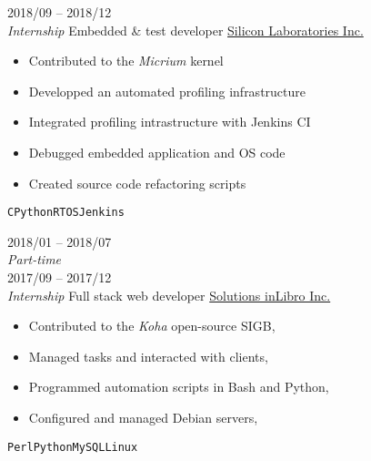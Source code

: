 \documentclass[9pt]{developercv} %
\begin{document}
\begin{minipage}[t]{0.8\textwidth}

\begin{entrylist}
	\entry
		{2018/09 -- 2018/12\\{\small\emph{Internship}}}
		{Embedded \& test developer}
		{\href{https://www.silabs.com/}{Silicon Laboratories Inc.}}
		{
			\vspace{-14pt}
			\begin{itemize}
				\renewcommand{\labelitemi}{\raisebox{.45ex}{\rule{.6ex}{.6ex}}} 
				\setlength\itemsep{-1pt}
				\item Contributed to the \emph{Micrium} kernel
				\item Developped an automated profiling infrastructure
				\item Integrated profiling intrastructure with Jenkins CI
				\item Debugged embedded application and OS code
				\item Created source code refactoring scripts
			\end{itemize}
			\vspace{-4pt}
			\texttt{C}\slashsep\texttt{Python}\slashsep\texttt{RTOS}\slashsep\texttt{Jenkins}
		}
	\entry
		{2018/01 -- 2018/07\\{\small\emph{Part-time}}\\2017/09 -- 2017/12\\{\small\emph{Internship}}}
		{Full stack web developer}
		{\href{https://inlibro.com/en/}{Solutions inLibro Inc.}}
		{
			\vspace{-14pt}
			\begin{itemize}
				\renewcommand{\labelitemi}{\raisebox{.45ex}{\rule{.6ex}{.6ex}}} 
				\setlength\itemsep{-1pt}
				\item Contributed to the \emph{Koha} open-source SIGB,
				\item Managed tasks and interacted with clients, 
				\item Programmed automation scripts in Bash and Python,
				\item Configured and managed Debian servers,
			\end{itemize}
			\vspace{-4pt}
			\texttt{Perl}\slashsep\texttt{Python}\slashsep\texttt{MySQL}\slashsep\texttt{Linux}
		}
\end{entrylist}



\end{minipage}
\end{document}
